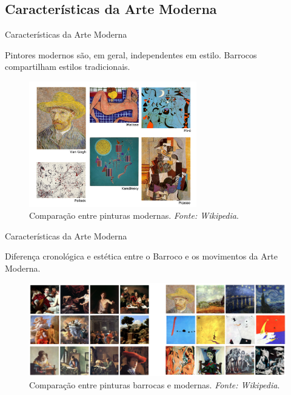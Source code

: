 \documentclass{beamer}
\begin{document}
\subsection{Características da Arte Moderna}

\begin{frame}{Características da Arte Moderna}
  
  Pintores modernos são, em geral, independentes em estilo. Barrocos compartilham estilos
  tradicionais.

  \begin{figure}[h!]
  \begin{center}
    \includegraphics[width=0.65\textwidth]{figs/compara_moderno2.png}
    \caption{Comparação entre pinturas modernas. \textit{Fonte: Wikipedia}.}
\end{center}
\end{figure}

\end{frame}

\begin{frame}{Características da Arte Moderna}

  Diferença cronológica e estética entre o Barroco
  e os movimentos da Arte Moderna.

  \begin{figure}[h!]
  \begin{center}
    \includegraphics[width=1.0\textwidth]{figs/compara_bar_mod.png}
    \caption{Comparação entre pinturas barrocas e modernas. \textit{Fonte: Wikipedia}.}
\end{center}
\end{figure}

\end{frame}
\end{document}
